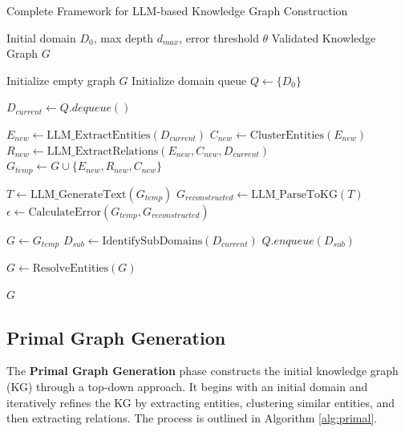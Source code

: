 \documentclass[11pt]{article}
\begin{document}
\clearpage

\begin{algorithm}[H]
    \caption{Complete Framework for LLM-based Knowledge Graph Construction}
    \label{alg:framework}
    \begin{algorithmic}[1]
        \Require Initial domain $D_0$, max depth $d_{max}$, error threshold $\theta$
        \Ensure Validated Knowledge Graph $G$

        \State Initialize empty graph $G$
        \State Initialize domain queue $Q \gets \{D_0\}$

        \State $D_{current} \gets Q.dequeue()$

        \State $E_{new} \gets \text{LLM\_ExtractEntities}(D_{current})$
        \State $C_{new} \gets \text{ClusterEntities}(E_{new})$
        \State $R_{new} \gets \text{LLM\_ExtractRelations}(E_{new}, C_{new}, D_{current})$
        \State $G_{temp} \gets G \cup \{E_{new}, R_{new}, C_{new}\}$

        \State $T \gets \text{LLM\_GenerateText}(G_{temp})$
        \State $G_{reconstructed} \gets \text{LLM\_ParseToKG}(T)$
        \State $\epsilon \gets \text{CalculateError}(G_{temp}, G_{reconstructed})$

        \If{$\epsilon \leq \theta$}
        \State $G \gets G_{temp}$
        \State $D_{sub} \gets \text{IdentifySubDomains}(D_{current})$
        \State $Q.enqueue(D_{sub})$
        \EndIf

        \State $G \gets \text{ResolveEntities}(G)$
        \EndIf
        \EndWhile

        \Return $G$
    \end{algorithmic}
\end{algorithm}

\subsection{Primal Graph Generation}

The \textbf{Primal Graph Generation} phase constructs the initial knowledge graph (KG) through a top-down approach. It begins with an initial domain and iteratively refines the KG by extracting entities, clustering similar entities, and then extracting relations. The process is outlined in Algorithm \ref{alg:primal}.
\end{document}
